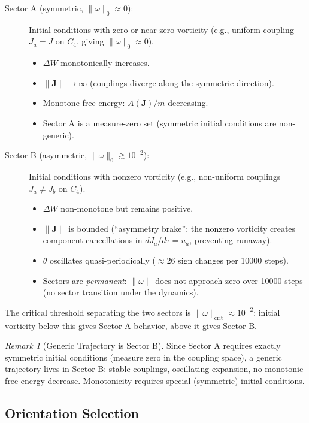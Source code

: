 \documentclass[11pt]{article}
\theoremstyle{definition}
\theoremstyle{remark}
\newtheorem{remark}[theorem]{Remark}
\newcommand{\obs}{u}
\newcommand{\vort}{\omega}
\newcommand{\coupl}{\mathbf{J}}
\newcommand{\expan}{\theta}
\begin{document}
\begin{description}
\item[Sector A (symmetric, $\|\vort\|_0 \approx 0$):]
  Initial conditions with zero or near-zero vorticity (e.g., uniform
  coupling $J_a = J$ on $C_4$, giving $\|\vort\|_0 \approx 0$).
  \begin{itemize}
  \item $\Delta W$ monotonically increases.
  \item $\|\coupl\| \to \infty$ (couplings diverge along the symmetric
    direction).
  \item Monotone free energy: $A(\coupl)/m$ decreasing.
  \item Sector A is a measure-zero set (symmetric initial conditions are
    non-generic).
  \end{itemize}

\item[Sector B (asymmetric, $\|\vort\|_0 \gtrsim 10^{-2}$):]
  Initial conditions with nonzero vorticity (e.g., non-uniform
  couplings $J_a \neq J_b$ on $C_4$).
  \begin{itemize}
  \item $\Delta W$ non-monotone but remains positive.
  \item $\|\coupl\|$ is bounded (``asymmetry brake'': the nonzero
    vorticity creates component cancellations in $dJ_a/d\tau = \obs_a$,
    preventing runaway).
  \item $\expan$ oscillates quasi-periodically ($\approx 26$ sign changes
    per 10000 steps).
  \item Sectors are \emph{permanent}: $\|\vort\|$ does not approach zero
    over 10000 steps (no sector transition under the dynamics).
  \end{itemize}
\end{description}

The critical threshold separating the two sectors is $\|\vort\|_{\mathrm{crit}}
\approx 10^{-2}$: initial vorticity below this gives Sector A behavior,
above it gives Sector B.

\begin{remark}[Generic Trajectory is Sector B]
Since Sector A requires exactly symmetric initial conditions (measure zero
in the coupling space), a generic trajectory lives in Sector B: stable
couplings, oscillating expansion, no monotonic free energy decrease.
Monotonicity requires special (symmetric) initial conditions.
\end{remark}

\subsection{Orientation Selection}
\label{subsec:orientation}
\end{document}
